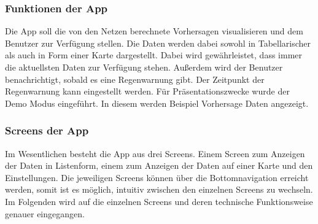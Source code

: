 


\subsubsection{Funktionen der App}\label{funkionen der app}
Die App soll die von den Netzen berechnete Vorhersagen visualisieren und dem Benutzer zur Verfügung stellen. Die Daten werden dabei sowohl in 
Tabellarischer als auch in Form einer Karte dargestellt. Dabei wird gewährleistet, dass immer die aktuellsten Daten zur Verfügung stehen. 
Außerdem wird der Benutzer benachrichtigt, sobald es eine Regenwarnung gibt. Der Zeitpunkt der Regenwarnung kann eingestellt werden.
Für Präsentationszwecke wurde der Demo Modus eingeführt. In diesem werden Beispiel Vorhersage Daten angezeigt.

\subsubsection{Screens der App}\label{screens der app}
Im Wesentlichen besteht die App aus drei Screens. Einem Screen zum Anzeigen der Daten in Listenform, 
einem zum Anzeigen der Daten auf einer Karte und den Einstellungen. 
Die jeweiligen Screens können über die Bottomnavigation erreicht werden, somit ist es möglich, intuitiv zwischen den einzelnen 
Screens zu wechseln.
Im Folgenden wird auf die einzelnen Screens und deren technische Funktionsweise genauer eingegangen.
